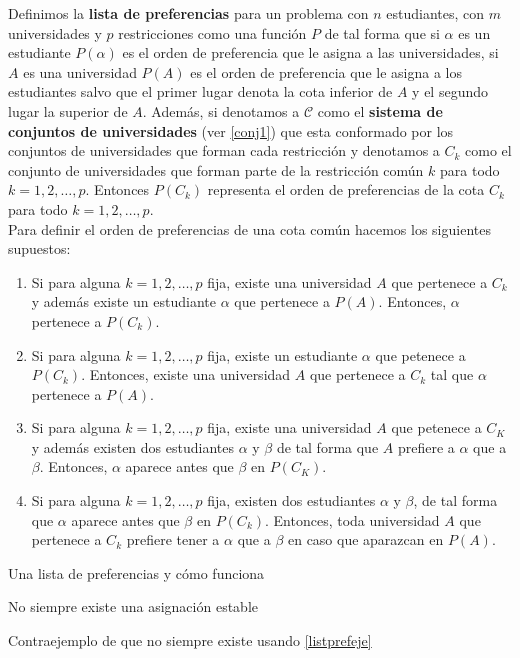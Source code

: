 \begin{dfn}
\label{listpref}
Definimos la \textbf{lista de preferencias} para un problema con $n$ estudiantes, con $m$ universidades y $p$ restricciones
como una función $P$ de tal forma que si $\alpha$ es un estudiante $P(\alpha)$ es el orden de preferencia que le asigna a las universidades,
si $A$ es una universidad $P(A)$ es el orden de preferencia que le asigna a los estudiantes salvo que el primer lugar denota la cota inferior de $A$ y el segundo lugar la superior de $A$.
Además, si denotamos a $\mathcal{C}$ como el \textbf{sistema de conjuntos de universidades} (ver \ref{conj1}) que esta conformado por los conjuntos de universidades que forman cada restricción y denotamos a $C_k$ como el conjunto de universidades que forman parte de la restricción común $k$ para todo $k=1,2,\dots,p$.
Entonces $P(C_k)$ representa el orden de preferencias de la cota $C_k$ para todo $k=1,2,\dots,p$.
\\ Para definir el orden de preferencias de una cota común hacemos los siguientes supuestos:
\begin{enumerate}
\item Si para alguna $k=1,2,\dots,p$ fija, existe una universidad $A$ que pertenece a $C_k$ y además existe un estudiante $\alpha$ que pertenece a $P(A)$. Entonces, $\alpha$ pertenece a $P(C_k)$.
\item Si para alguna $k=1,2,\dots,p$ fija, existe un estudiante $\alpha$ que petenece a $P(C_k)$. Entonces, existe una universidad $A$ que pertenece a $C_k$ tal que $\alpha$ pertenece a $P(A)$.
\item Si para alguna $k=1,2,\dots,p$ fija, existe una universidad $A$ que petenece a $C_K$ y además existen dos estudiantes $\alpha$ y $\beta$ de tal forma que $A$ prefiere a $\alpha$ que a $\beta$. Entonces, $\alpha$ aparece antes que $\beta$ en $P(C_K)$.
\item Si para alguna $k=1,2,\dots,p$ fija, existen dos estudiantes $\alpha$ y $\beta$, de tal forma que $\alpha$ aparece antes que $\beta$ en $P(C_k)$. Entonces, toda universidad $A$ que pertenece a $C_k$ prefiere tener a $\alpha$ que a $\beta$ en caso que aparazcan en $P(A)$.
\end{enumerate}

 \end{dfn}

\begin{eje} \cite{Todo}
\label{listprefeje}
Una lista de preferencias y cómo funciona
\end{eje}

No siempre existe una asignación estable

\begin{eje}
Contraejemplo de que no siempre existe usando \ref{listprefeje}
\end{eje}










